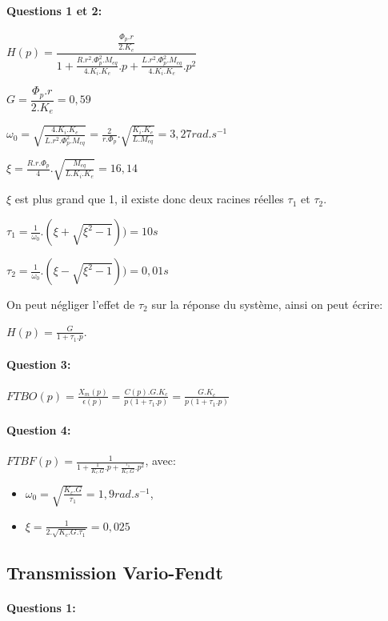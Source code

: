 \paragraph{Questions 1 et 2:} 

$H(p)=\dfrac{\frac{\Phi_p.r}{2.K_e}}{1+\frac{R.r^2.\Phi_p^2.M_{eq}}{4.K_i.K_e}.p+\frac{L.r^2.\Phi_p^2.M_{eq}}{4.K_i.K_e}.p^2}$

$G=\dfrac{\Phi_p.r}{2.K_e}=0,59$

$\omega_0=\sqrt{\frac{4.K_i.K_e}{L.r^2.\Phi_p^2.M_{eq}}}=\frac{2}{r.\Phi_p}.\sqrt{\frac{K_i.K_e}{L.M_{eq}}}=3,27rad.s^{-1}$

$\xi=\frac{R.r.\Phi_p}{4}.\sqrt{\frac{M_{eq}}{L.K_i.K_e}}=16,14$

$\xi$ est plus grand que 1, il existe donc deux racines réelles $\tau_1$ et $\tau_2$.

$\tau_1=\frac{1}{\omega_0}.(\xi+\sqrt{\xi^2-1}))=10s$

$\tau_2=\frac{1}{\omega_0}.(\xi-\sqrt{\xi^2-1}))=0,01s$

On peut négliger l'effet de $\tau_2$ sur la réponse du système, ainsi on peut écrire:

$H(p)=\frac{G}{1+\tau_1.p}$.

\paragraph{Question 3:}

$FTBO(p)=\frac{X_m(p)}{\epsilon (p)}=\frac{C(p).G.K_c}{p(1+\tau_1.p)}=\frac{G.K_c}{p(1+\tau_1.p)}$

\paragraph{Question 4:}

$FTBF(p)=\frac{1}{1+\frac{1}{K_c.G}.p+\frac{\tau_1}{K_c.G}.p^2}$, avec:

\begin{itemize}
 \item $\omega_0=\sqrt{\frac{K_c.G}{\tau_1}}=1,9rad.s^{-1}$,
 \item $\xi=\frac{1}{2.\sqrt{K_c.G.\tau_1}}=0,025$
\end{itemize}

\subsection{Transmission Vario-Fendt}

\paragraph{Questions 1:}

